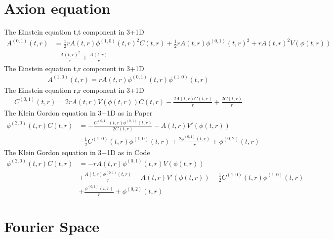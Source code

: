 \documentclass{article}
\begin{document}
\section{Axion equation }
The Einstein equation t,t component in 3+1D
\begin{equation}
    \label{KG Equation }
    \begin{split}
A^{(0,1)}(t,r)&=\frac{1}{2} r A(t,r) \phi^{(1,0)}(t,r)^2 C(t,r)+\frac{1}{2} r A(t,r) \phi^{(0,1)}(t,r)^2+r A(t,r)^2 V(\phi(t,r))
\\&-\frac{A(t,r)^2}{r}+\frac{A(t,r)}{r}
	\end{split}
\end{equation}
The Einstein equation t,r component in 3+1D
\begin{equation}
\begin{split}
A^{(1,0)}(t,r)=r A(t,r) \phi^{(0,1)}(t,r) \phi^{(1,0)}(t,r)
\end{split}
\end{equation}
The Einstein equation r,r component in 3+1D
\begin{equation}
\begin{split}
C^{(0,1)}(t,r)=2 r A(t,r) V(\phi(t,r)) C(t,r)-\frac{2 A(t,r) C(t,r)}{r}+\frac{2 C(t,r)}{r}
\end{split}
\end{equation}
The Klein Gordon equation in 3+1D as in Paper 
\begin{equation}
\begin{split}
\phi^{(2,0)}(t,r) C(t,r)&=-\frac{C^{(0,1)}(t,r) \phi^{(0,1)}(t,r)}{2 C(t,r)}-A(t,r) V'(\phi(t,r))
\\&-\frac{1}{2} C^{(1,0)}(t,r) \phi^{(1,0)}(t,r)+\frac{2 \phi^{(0,1)}(t,r)}{r}+\phi^{(0,2)}(t,r)
\end{split}
\end{equation}
The Klein Gordon equation in 3+1D as in Code 
\begin{equation}
\begin{split}
\phi^{(2,0)}(t,r) C(t,r)&=-r A(t,r) \phi^{(0,1)}(t,r) V(\phi(t,r))\\&+\frac{A(t,r) \phi^{(0,1)}(t,r)}{r}-A(t,r) V'(\phi(t,r))-\frac{1}{2} C^{(1,0)}(t,r) \phi^{(1,0)}(t,r)
\\&+\frac{\phi^{(0,1)}(t,r)}{r}+\phi^{(0,2)}(t,r)
\end{split}
\end{equation}

\section{Fourier Space }
\end{document}
